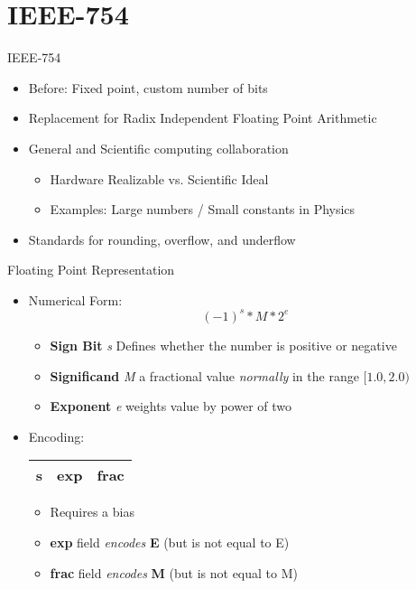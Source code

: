 \section{IEEE-754}
\begin{frame}{IEEE-754}
  \begin{itemize}
  \item Before: Fixed point, custom number of bits
  \item Replacement for Radix Independent Floating Point Arithmetic
  \item General and Scientific computing collaboration
    \begin{itemize}
    \item Hardware Realizable vs. Scientific Ideal
    \item Examples: Large numbers / Small constants in Physics
    \end{itemize}
  \item Standards for rounding, overflow, and underflow
  \end{itemize}
\end{frame}
\begin{frame}{Floating Point Representation}
  \begin{itemize}
  \item Numerical Form:
    \begin{equation}
      (-1)^{s} * M * 2^{e}
    \end{equation}
    \begin{itemize}
    \item \textbf{Sign Bit} \emph{s} Defines whether the number is positive or negative
    \item \textbf{Significand} \emph{M} a fractional value \emph{normally} in
      the range $[1.0, 2.0)$
      \item \textbf{Exponent} \emph{e} weights value by power of two
    \end{itemize}
  \item Encoding: \\
    \begin{tabular}{|l|l|l|}
      \hline
      s & exp & frac\\
      \hline
    \end{tabular}
    \begin{itemize}
    \item Requires a bias
    \item \textbf{exp} field \emph{encodes} \textbf{E} (but is not equal to E)
    \item \textbf{frac} field \emph{encodes} \textbf{M} (but is not equal to M)
    \end{itemize}
  \end{itemize}
\end{frame}
